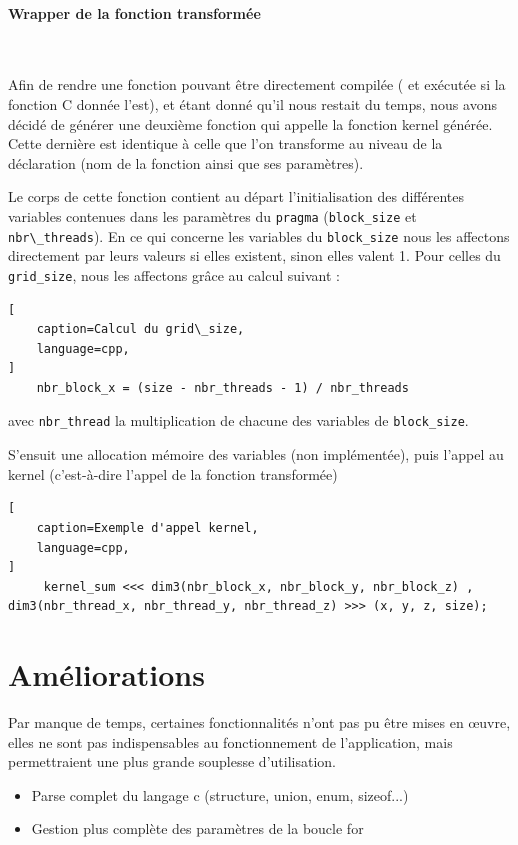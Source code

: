 \documentclass{article}
\begin{document}
	\paragraph{Wrapper de la fonction transformée}
	~~\\
	\indent
	
	Afin de rendre une fonction pouvant être directement compilée ( et exécutée si la fonction C donnée l'est), et étant donné qu'il nous restait du temps, nous avons décidé de générer une deuxième fonction qui appelle la fonction kernel générée. Cette dernière est identique à celle que l'on transforme au niveau de la déclaration (nom de la fonction ainsi que ses paramètres).
	
	Le corps de cette fonction contient au départ l'initialisation des différentes variables contenues dans les paramètres du \verb|pragma| (\verb|block_size| et \verb|nbr\_threads|).
	En ce qui concerne les variables du \verb|block_size| nous les affectons directement par leurs valeurs si elles existent, sinon elles valent 1.
	Pour celles du \verb|grid_size|, nous les affectons grâce au calcul suivant : 
\begin{lstlisting}[
	caption=Calcul du grid\_size,
    language=cpp,
]
	nbr_block_x = (size - nbr_threads - 1) / nbr_threads
\end{lstlisting}	
	 avec \verb|nbr_thread| la multiplication de chacune des variables de \verb|block_size|.
	
	S'ensuit une allocation mémoire des variables (non implémentée), puis l'appel au kernel (c'est-à-dire l'appel de la fonction transformée)
	\begin{lstlisting}[
	caption=Exemple d'appel kernel,
    language=cpp,
]
	 kernel_sum <<< dim3(nbr_block_x, nbr_block_y, nbr_block_z) , dim3(nbr_thread_x, nbr_thread_y, nbr_thread_z) >>> (x, y, z, size);
\end{lstlisting}	

	\newpage

	
	
	
	\section{Améliorations}
	Par manque de temps, certaines fonctionnalités n'ont pas pu être mises en œuvre, elles ne sont pas indispensables au fonctionnement de l'application, mais permettraient une plus grande souplesse d'utilisation.
	\begin{itemize}
		\item Parse complet du langage c (structure, union, enum, sizeof...)
		\item Gestion plus complète des paramètres de la boucle for
	\end{itemize}
	
\end{document}
